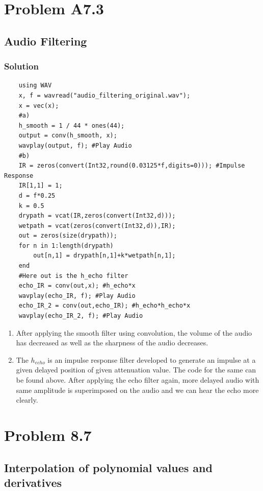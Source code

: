 \documentclass{article}
\begin{document}
\section*{Problem A7.3}
\subsection*{Audio Filtering}
\subsubsection*{Solution}
    \begin{verbatim}
    using WAV
    x, f = wavread("audio_filtering_original.wav");
    x = vec(x);
    #a) 
    h_smooth = 1 / 44 * ones(44);
    output = conv(h_smooth, x);
    wavplay(output, f); #Play Audio
    #b)
    IR = zeros(convert(Int32,round(0.03125*f,digits=0))); #Impulse Response
    IR[1,1] = 1;
    d = f*0.25
    k = 0.5
    drypath = vcat(IR,zeros(convert(Int32,d)));
    wetpath = vcat(zeros(convert(Int32,d)),IR);
    out = zeros(size(drypath));
    for n in 1:length(drypath)
        out[n,1] = drypath[n,1]+k*wetpath[n,1];
    end
    #Here out is the h_echo filter
    echo_IR = conv(out,x); #h_echo*x
    wavplay(echo_IR, f); #Play Audio
    echo_IR_2 = conv(out,echo_IR); #h_echo*h_echo*x
    wavplay(echo_IR_2, f); #Play Audio
\end{verbatim}
\begin{enumerate}[label=\alph*]
    \item After applying the smooth filter using convolution, the volume of the audio has decreased as well as the sharpness of the audio decreases.
    \item The $h_{echo}$ is an impulse response filter developed to generate an impulse at a given delayed position of given attenuation value. The code for the same can be found above. After applying the echo filter again, more delayed audio with same amplitude is superimposed on the audio and we can hear the echo more clearly.
\end{enumerate}
\section*{Problem 8.7}
\subsection*{Interpolation of polynomial values and derivatives}
\end{document}
